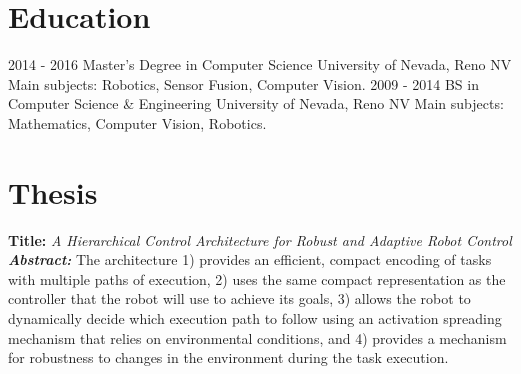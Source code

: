 \documentclass[9pt]{friggeri-cv}
\begin{document}
\section{Education}
\begin{entrylist}
  \entry
    {2014 - 2016}
    {Master's Degree in Computer Science}
    {University of Nevada, Reno NV}
    {Main subjects: Robotics, Sensor Fusion, Computer Vision.}
  \entry
    {2009 - 2014}
    {BS in Computer Science \& Engineering}
    {University of Nevada, Reno NV}
    {Main subjects: Mathematics, Computer Vision, Robotics.}
\end{entrylist}

\section{Thesis}
{\textbf{Title:} \emph{A Hierarchical Control Architecture for Robust and Adaptive Robot Control \\ \textbf{Abstract:}}}
{The architecture 1) provides an efficient, compact encoding of tasks with multiple paths of execution, 2) uses the same compact representation as the controller that the robot will use to achieve its goals, 3) allows the robot to dynamically decide which execution path to follow using an activation spreading mechanism that relies on environmental conditions, and 4) provides a mechanism for robustness to changes in the environment during the task execution.}

\end{document}
